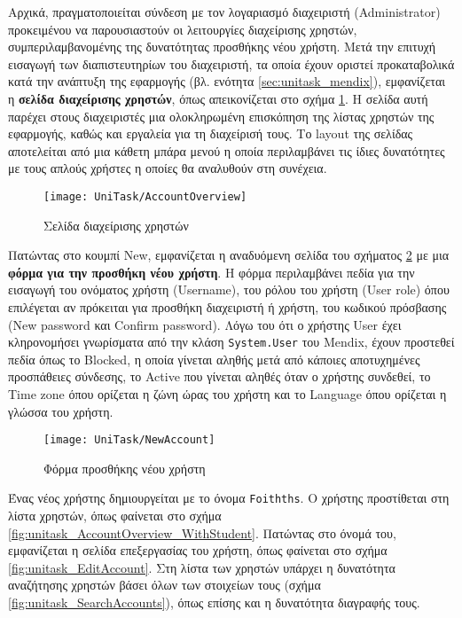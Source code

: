         Αρχικά, πραγματοποιείται σύνδεση με τον λογαριασμό διαχειριστή (Administrator) προκειμένου να παρουσιαστούν οι λειτουργίες διαχείρισης χρηστών, συμπεριλαμβανομένης της δυνατότητας προσθήκης νέου χρήστη. Μετά την επιτυχή εισαγωγή των διαπιστευτηρίων του διαχειριστή, τα οποία έχουν οριστεί προκαταβολικά κατά την ανάπτυξη της εφαρμογής (βλ. ενότητα \ref{sec:unitask_mendix}), εμφανίζεται η \textbf{σελίδα διαχείρισης χρηστών}, όπως απεικονίζεται στο σχήμα \ref{fig:unitask_AccountOverview}. Η σελίδα αυτή παρέχει στους διαχειριστές μια ολοκληρωμένη επισκόπηση της λίστας χρηστών της εφαρμογής, καθώς και εργαλεία για τη διαχείρισή τους. Το layout της σελίδας αποτελείται από μια κάθετη μπάρα μενού η οποία περιλαμβάνει τις ίδιες δυνατότητες με τους απλούς χρήστες η οποίες θα αναλυθούν στη συνέχεια.

       \begin{figure}[h!] \noindent \centering
            \texttt{[image: UniTask/AccountOverview]}
            \caption{\centering Σελίδα διαχείρισης χρηστών}
            \label{fig:unitask_AccountOverview}
        \end{figure}

        Πατώντας στο κουμπί {\Zona New}, εμφανίζεται η αναδυόμενη σελίδα του σχήματος \ref{fig:unitask_NewAccount} με μια \textbf{φόρμα για την προσθήκη νέου χρήστη}. Η φόρμα περιλαμβάνει πεδία για την εισαγωγή του ονόματος χρήστη ({\Zona Username}), του ρόλου του χρήστη ({\Zona User role}) όπου επιλέγεται αν πρόκειται για προσθήκη διαχειριστή ή χρήστη, του κωδικού πρόσβασης ({\Zona New password} και {\Zona Confirm password}). Λόγω του ότι ο χρήστης User έχει κληρονομήσει γνωρίσματα από την κλάση \texttt{System.User} του Mendix, έχουν προστεθεί πεδία όπως το {\Zona Blocked}, η οποία γίνεται αληθής μετά από κάποιες αποτυχημένες προσπάθειες σύνδεσης, το {\Zona Active} που γίνεται αληθές όταν ο χρήστης συνδεθεί, το {\Zona Time zone} όπου ορίζεται η ζώνη ώρας του χρήστη και το {\Zona Language} όπου ορίζεται η γλώσσα του χρήστη.

        \begin{figure}[h!] \noindent \centering
            \texttt{[image: UniTask/NewAccount]}
            \caption{\centering Φόρμα προσθήκης νέου χρήστη}
            \label{fig:unitask_NewAccount}
        \end{figure}

        Ένας νέος χρήστης δημιουργείται με το όνομα \texttt{Foithths}. Ο χρήστης προστίθεται στη λίστα χρηστών, όπως φαίνεται στο σχήμα \ref{fig:unitask_AccountOverview_WithStudent}. Πατώντας στο όνομά του, εμφανίζεται η σελίδα επεξεργασίας του χρήστη, όπως φαίνεται στο σχήμα \ref{fig:unitask_EditAccount}. Στη λίστα των χρηστών υπάρχει η δυνατότητα αναζήτησης χρηστών βάσει όλων των στοιχείων τους (σχήμα \ref{fig:unitask_SearchAccounts}), όπως επίσης και η δυνατότητα διαγραφής τους.

